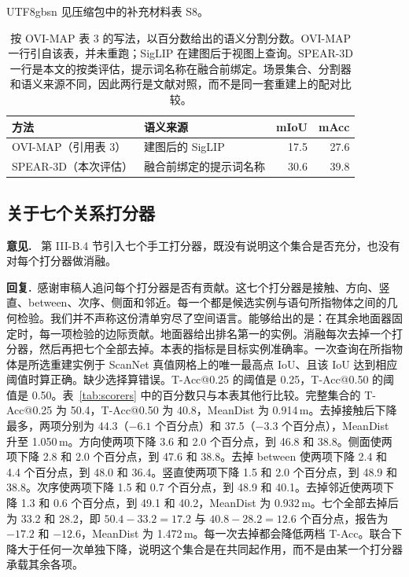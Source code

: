 \documentclass[11pt]{article}
\newcommand{\revcomment}[1]{%
  \par\vspace{0.6em}\noindent\textcolor{revblue}{\textbf{意见.}}\ %
  \textcolor{revblue}{#1}\par\vspace{0.4em}}
\newcommand{\revresponse}[1]{%
  \par\noindent\textbf{回复.}\ #1\par\vspace{0.3em}}
\begin{document}
\begin{CJK*}{UTF8}{gbsn}
\noindent 见压缩包中的补充材料表 S8。

\begin{table}[ht]
\centering
\caption{按 OVI-MAP 表 3 的写法，以百分数给出的语义分割分数。OVI-MAP 一行引自该表，并未重跑；SigLIP 在建图后于视图上查询。SPEAR-3D 一行是本文的按类评估，提示词名称在融合前绑定。场景集合、分割器和语义来源不同，因此两行是文献对照，而不是同一套重建上的配对比较。}
\label{tab:ovimap}
\small
\begin{tabular}{llrr}
\toprule
方法 & 语义来源 & mIoU & mAcc \\
\midrule
OVI-MAP（引用表 3） & 建图后的 SigLIP & 17.5 & 27.6 \\
SPEAR-3D（本次评估） & 融合前绑定的提示词名称 & 30.6 & 39.8 \\
\bottomrule
\end{tabular}
\end{table}

\subsection*{关于七个关系打分器}

\revcomment{第 III-B.4 节引入七个手工打分器，既没有说明这个集合是否充分，也没有对每个打分器做消融。}

\revresponse{感谢审稿人追问每个打分器是否有贡献。这七个打分器是接触、方向、竖直、between、次序、侧面和邻近。每一个都是候选实例与语句所指物体之间的几何检验。我们并不声称这份清单穷尽了空间语言。能够给出的是：在其余地面器固定时，每一项检验的边际贡献。地面器给出排名第一的实例。消融每次去掉一个打分器，然后再把七个全部去掉。本表的指标是目标实例准确率。一次查询在所指物体是所选重建实例于 ScanNet 真值网格上的唯一最高点 IoU、且该 IoU 达到相应阈值时算正确。缺少选择算错误。T-Acc@0.25 的阈值是 0.25，T-Acc@0.50 的阈值是 0.50。表~\ref{tab:scorers} 中的百分数只与本表其他行比较。完整集合的 T-Acc@0.25 为 50.4，T-Acc@0.50 为 40.8，MeanDist 为 0.914\,m。去掉接触后下降最多，两项分别为 44.3（\(-6.1\) 个百分点）和 37.5（\(-3.3\) 个百分点），MeanDist 升至 1.050\,m。方向使两项下降 3.6 和 2.0 个百分点，到 46.8 和 38.8。侧面使两项下降 2.8 和 2.0 个百分点，到 47.6 和 38.8。去掉 between 使两项下降 2.4 和 4.4 个百分点，到 48.0 和 36.4。竖直使两项下降 1.5 和 2.0 个百分点，到 48.9 和 38.8。次序使两项下降 1.5 和 0.7 个百分点，到 48.9 和 40.1。去掉邻近使两项下降 1.3 和 0.6 个百分点，到 49.1 和 40.2，MeanDist 为 0.932\,m。七个全部去掉后为 33.2 和 28.2，即 \(50.4-33.2=17.2\) 与 \(40.8-28.2=12.6\) 个百分点，报告为 \(-17.2\) 和 \(-12.6\)，MeanDist 为 1.472\,m。每一次去掉都会降低两档 T-Acc。联合下降大于任何一次单独下降，说明这个集合是在共同起作用，而不是由某一个打分器承载其余各项。}


\end{CJK*}
\end{document}
